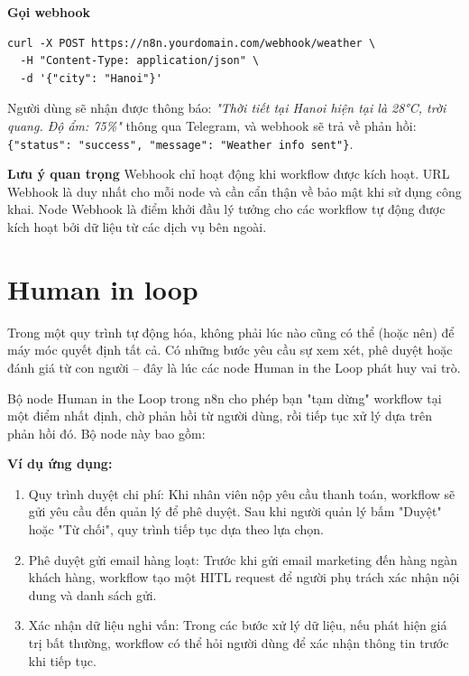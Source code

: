 \textbf{Gọi webhook}
\begin{lstlisting}
curl -X POST https://n8n.yourdomain.com/webhook/weather \
  -H "Content-Type: application/json" \
  -d '{"city": "Hanoi"}'
\end{lstlisting}

Người dùng sẽ nhận được thông báo: \textit{"Thời tiết tại Hanoi hiện tại là 28°C, trời quang. Độ ẩm: 75\%"} thông qua Telegram, và webhook sẽ trả về phản hồi: \texttt{\{"status": "success", "message": "Weather info sent"\}}.

\textbf{Lưu ý quan trọng}
Webhook chỉ hoạt động khi workflow được kích hoạt. URL Webhook là duy nhất cho mỗi node và cần cẩn thận về bảo mật khi sử dụng công khai. Node Webhook là điểm khởi đầu lý tưởng cho các workflow tự động được kích hoạt bởi dữ liệu từ các dịch vụ bên ngoài.

\section{Human in loop}
Trong một quy trình tự động hóa, không phải lúc nào cũng có thể (hoặc nên) để máy móc quyết định tất cả. Có những bước yêu cầu sự xem xét, phê duyệt hoặc đánh giá từ con người – đây là lúc các node Human in the Loop phát huy vai trò.

Bộ node Human in the Loop trong n8n cho phép bạn "tạm dừng" workflow tại một điểm nhất định, chờ phản hồi từ người dùng, rồi tiếp tục xử lý dựa trên phản hồi đó. Bộ node này bao gồm:

\textbf{Ví dụ ứng dụng:}
\begin{enumerate}
    \item Quy trình duyệt chi phí: Khi nhân viên nộp yêu cầu thanh toán, workflow sẽ gửi yêu cầu đến quản lý để phê duyệt. Sau khi người quản lý bấm "Duyệt" hoặc "Từ chối", quy trình tiếp tục dựa theo lựa chọn.

    \item Phê duyệt gửi email hàng loạt: Trước khi gửi email marketing đến hàng ngàn khách hàng, workflow tạo một HITL request để người phụ trách xác nhận nội dung và danh sách gửi.

    \item Xác nhận dữ liệu nghi vấn: Trong các bước xử lý dữ liệu, nếu phát hiện giá trị bất thường, workflow có thể hỏi người dùng để xác nhận thông tin trước khi tiếp tục.
\end{enumerate}

